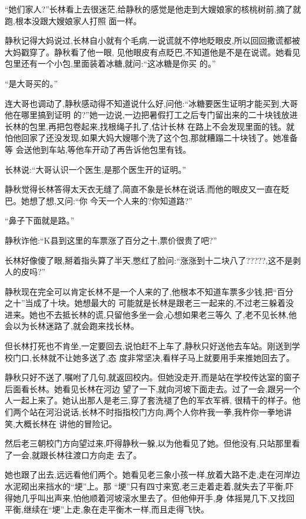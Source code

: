 ﻿\documentclass[12pt]{article}
\begin{document}
``她们家人?''长林看上去很迷茫,给静秋的感觉是他走到大嫂娘家的核桃树前,摘了就跑,根本没跟大嫂娘家人打照
面一样。

静秋记得大妈说过,长林自小就有个毛病,一说谎就不停地眨眼皮,所以回回撒谎都被大妈戳穿了。静秋看了他一眼,
见他眼皮有点眨巴,不知道他是不是在说谎。她看见包里还有一个小包,里面装着冰糖,就问:``这\myrule 冰糖是你买
的。''

``是\myrule 大哥\myrule 买的。''

连大哥也调动了,静秋感动得不知道说什么好,问他:``冰糖要医生证明才能买到,大哥他在哪里\myrule 搞到证明
的?''她一边说,一边把暑假打工之后专门留出来的二十块钱放进长林的包里,再把包卷起来,找根绳子扎了,估计长林
在路上不会发现里面的钱。就怕他回家了还没发现,如果大妈大嫂哪个洗了这个包,那就糟蹋二十块钱了。她准备等
会送他到车站,等他车开动了再告诉他包里有钱。

长林说:``大哥认识一个医生,是那个医生开的证明。''

静秋觉得长林答得太天衣无缝了,简直不象是长林在说话,而他的眼皮又一直在眨巴。她想了想,又问:``你\myrule 
今天一个人来的?你\myrule 知道路?''

``鼻子下面就是路。''

静秋诈他:``K县到这里的车票涨了百分之十,票价很贵了吧?''

长林好像傻了眼,掰着指头算了半天,憋红了脸问:``涨\myrule 涨到十二块八了?????,这不是剥人的皮吗?''

静秋现在完全可以肯定长林不是一个人来的了,他根本不知道车票多少钱,把``百分之十''当成了十块。她想最大的
可能就是长林是跟老三一起来的,不过老三躲着没进来。她也不去抵长林的谎,只留他多坐一会,心想如果老三等久
了,老不见长林,他会以为长林迷路了,就会跑来找长林。

但长林打死也不肯坐,一定要回去,说怕赶不上车了,静秋只好送他去车站。刚送到学校门口,长林就不让她多送了,态
度非常坚决,看样子马上就要用手来推她回去了。

静秋只好不送了,嘱咐了几句,就返回校内。但她没走开,而是站在学校传达室的窗子后面看长林。她看见长林在河边
望了一下,就向河坡下面走去。过了一会,跟另一个人一起上来了。她认出那人是老三,穿了套洗褪了色的军衣军裤,
很精干的样子。他们两个站在河沿说话,长林不时指指校门方向,两个人你杵我一拳,我杵你一拳地讲笑,大概长林在
讲他的冒险记。

然后老三朝校门方向望过来,吓得静秋一躲,以为他看见了她。但他没有,只站那里看了一会,就跟长林往渡口方向走
去了。

她也跟了出去,远远看他们两个。她看见老三象小孩一样,放着大路不走,走在河岸边水泥砌出来挡水的``埂''上。那
``埂''只有四寸来宽,老三走着走着,就失去了平衡,吓得她几乎叫出声来,怕他顺着河坡滚水里去了。但他伸开手,身
体摇晃几下,又找回平衡,继续在``埂''上走,象在走平衡木一样,而且走得飞快。
\end{document}
